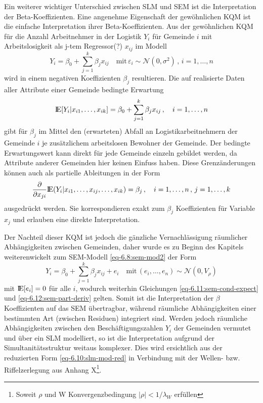 Ein weiterer wichtiger Unterschied zwischen SLM und SEM ist die Interpretation der Beta-Koeffizienten. 
Eine angenehme Eigenschaft der gewöhnlichen KQM ist die einfache Interpretation ihrer Beta-Koeffizienten.
Aus der gewöhnlichen KQM für die Anzahl Arbeitnehmer in der Logistik $Y_{i}$ für Gemeinde $i$ mit 
Arbeitslosigkeit als j-tem Regressor(?) $x_{ij}$ im Modell
\begin{equation*}
    Y_{i}=\beta_{0}+\sum_{j=1}^{k} \beta_{j} x_{ij} \quad \text{mit} \, \varepsilon_{i} \sim \mathcal{N}(0,\sigma^{2})\,, \, i=1,\ldots,n
\end{equation*}
wird in einem negativen Koeffizienten $\beta_{j}$ resultieren. Die auf realisierte Daten aller Attribute einer Gemeinde bedingte Erwartung
\begin{equation} \label{eq-6.11:sem-cond-expect}
    {\rm I\!E}[Y_{i}|x_{i1},\ldots,x_{ik}]=\beta_{0}+\sum_{j=1}^{k} \beta_{j} x_{ij} \, , \quad i=1,\ldots,n
\end{equation}
gibt für $\beta_{j}$ im Mittel den (erwarteten) Abfall an Logistikarbeitnehmern der Gemeinde $i$ je 
zusätzlichem arbeitslosen Bewohner der Gemeinde. Der bedingte Erwartungswert kann direkt für jede Gemeinde einzeln 
gebildet werden, da Attribute anderer Gemeinden hier keinen Einfuss haben.
Diese Grenzänderungen können auch als partielle Ableitungen in der Form
\begin{equation} \label{eq-6.12:sem-part-deriv}
    \frac{\partial}{\partial x_{ji}} {\rm I\!E}(Y_{i}|x_{i1},\ldots,x_{ij},\ldots,x_{ik})=\beta_{j} \, , \quad i=1,\ldots,n \, , \, j=1,\ldots,k
\end{equation}
ausgedrückt werden. Sie korrespondieren exakt zum $\beta_{j}$ Koeffizienten für Variable $x_{j}$ und erlauben eine direkte Interpretation.

Der Nachteil dieser KQM ist jedoch die gänzliche Vernachlässigung räumlicher Abhängigkeiten zwischen Gemeinden, daher wurde es zu Beginn des 
Kapitels weiterenwickelt zum SEM-Modell \eqref{eq-6.8:sem-mod2} der Form
\begin{equation*}
    Y_{i}=\beta_{0}+\sum_{j=1}^{k} \beta_{j} x_{ij} + e_{i} \quad 
    \text{mit} \, (e_{i},\ldots,e_{n}) \sim \mathcal{N}(0,V_{\rho})
\end{equation*}
mit ${\rm I\!E}[e_{i}]=0$ für alle $i$, wodurch weiterhin Gleichungen \eqref{eq-6.11:sem-cond-expect} und \eqref{eq-6.12:sem-part-deriv} gelten. 
Somit ist die Interpretation der $\beta$ Koeffizienten auf das SEM übertragbar, während räumliche Abhängigkeiten einer bestimmten Art (zwischen Residuen) integriert sind. 
Werden jedoch räumliche Abhängigkeiten zwischen den Beschäftigungszahlen $Y_{i}$ 
der Gemeinden vermutet und über ein SLM modelliert, so ist die Interpretation aufgrund der Simultanitätsstruktur 
weitaus komplexer. Dies wird ersichtlich aus der 
reduzierten Form \eqref{eq-6.10:slm-mod-red} in Verbindung mit der Wellen- bzw. Riffelzerlegung aus
Anhang X\footnote[1]{Soweit $\rho$ und W Konvergenzbedingung $ \left| \rho \right| <1/\lambda_{W}$ erfüllen}.

